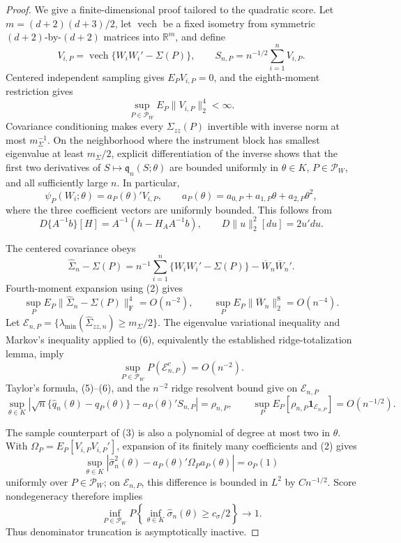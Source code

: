 \documentclass{article}
\begin{document}
\begin{proof}
We give a finite-dimensional proof tailored to the quadratic score. Let \(m=(d+2)(d+3)/2\), let \(\operatorname{vech}\) be a fixed isometry from symmetric \((d+2)\)-by-\((d+2)\) matrices into \(\mathbb R^m\), and define
\[
 V_{i,P}=\operatorname{vech}\{W_iW_i'-\Sigma(P)\},
 \qquad S_{n,P}=n^{-1/2}\sum_{i=1}^nV_{i,P}. \tag{1}
\]
Centered independent sampling gives \(E_PV_{i,P}=0\), and the eighth-moment restriction gives
\[
 \sup_{P\in\mathcal P_W}E_P\|V_{i,P}\|_2^4<\infty. \tag{2}
\]
Covariance conditioning makes every \(\Sigma_{zz}(P)\) invertible with inverse norm at most \(m_\Sigma^{-1}\). On the neighborhood where the instrument block has smallest eigenvalue at least \(m_\Sigma/2\), explicit differentiation of the inverse shows that the first two derivatives of \(S\mapsto\mathfrak q_n(S;\theta)\) are bounded uniformly in \(\theta\in K\), \(P\in\mathcal P_W\), and all sufficiently large \(n\). In particular,
\[
 \psi_P(W_i;\theta)=a_P(\theta)'V_{i,P},
 \qquad
 a_P(\theta)=a_{0,P}+a_{1,P}\theta+a_{2,P}\theta^2, \tag{3}
\]
where the three coefficient vectors are uniformly bounded. This follows from
\[
 D\{A^{-1}b\}[H]=A^{-1}(h-H_AA^{-1}b),
 \qquad D\|u\|_2^2[du]=2u'du. \tag{4}
\]

The centered covariance obeys
\[
 \widehat\Sigma_n-\Sigma(P)
 =n^{-1}\sum_{i=1}^n\{W_iW_i'-\Sigma(P)\}
 -\overline W_n\overline W_n'. \tag{5}
\]
Fourth-moment expansion using (2) gives
\[
 \sup_PE_P\|\widehat\Sigma_n-\Sigma(P)\|_{\mathrm F}^4=O(n^{-2}),
 \qquad
 \sup_PE_P\|\overline W_n\|_2^8=O(n^{-4}). \tag{6}
\]
Let \(\mathcal E_{n,P}=\{\lambda_{\min}(\widehat\Sigma_{zz,n})\geq m_\Sigma/2\}\). The eigenvalue variational inequality and Markov's inequality applied to (6), equivalently the established ridge-totalization lemma, imply
\[
 \sup_{P\in\mathcal P_W}P(\mathcal E_{n,P}^c)=O(n^{-2}). \tag{7}
\]
Taylor's formula, (5)--(6), and the \(n^{-2}\) ridge resolvent bound give on \(\mathcal E_{n,P}\)
\[
 \sup_{\theta\in K}\left|
 \sqrt n\{\widehat q_n(\theta)-q_P(\theta)\}
 -a_P(\theta)'S_{n,P}\right|=\rho_{n,P},
 \qquad
 \sup_PE_P[\rho_{n,P}\mathbf1_{\mathcal E_{n,P}}]=O(n^{-1/2}). \tag{8}
\]

The sample counterpart of (3) is also a polynomial of degree at most two in \(\theta\). With \(\Omega_P=E_P[V_{i,P}V_{i,P}']\), expansion of its finitely many coefficients and (2) gives
\[
 \sup_{\theta\in K}\left|
 \widehat\sigma_n^2(\theta)-a_P(\theta)'\Omega_Pa_P(\theta)
 \right|=o_P(1) \tag{9}
\]
uniformly over \(P\in\mathcal P_W\); on \(\mathcal E_{n,P}\), this difference is bounded in \(L^2\) by \(Cn^{-1/2}\). Score nondegeneracy therefore implies
\[
 \inf_{P\in\mathcal P_W}P\left\{
 \inf_{\theta\in K}\widehat\sigma_n(\theta)\geq c_\sigma/2
 \right\}\longrightarrow1. \tag{10}
\]
Thus denominator truncation is asymptotically inactive.


\end{proof}
\end{document}
